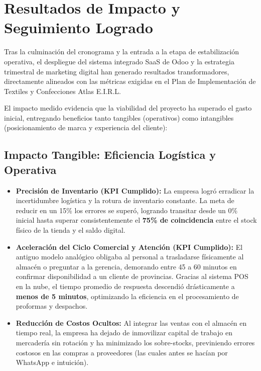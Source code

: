\section{Resultados de Impacto y Seguimiento Logrado}

Tras la culminación del cronograma y la entrada a la etapa de estabilización operativa, el despliegue del sistema integrado SaaS de Odoo y la estrategia trimestral de marketing digital han generado resultados transformadores, directamente alineados con las métricas exigidas en el Plan de Implementación de Textiles y Confecciones Atlas E.I.R.L.

El impacto medido evidencia que la viabilidad del proyecto ha superado el gasto inicial, entregando beneficios tanto tangibles (operativos) como intangibles (posicionamiento de marca y experiencia del cliente):

\subsection{Impacto Tangible: Eficiencia Logística y Operativa}
\begin{itemize}
    \item \textbf{Precisión de Inventario (KPI Cumplido):} La empresa logró erradicar la incertidumbre logística y la rotura de inventario constante. La meta de reducir en un 15\% los errores se superó, logrando transitar desde un 0\% inicial hasta superar consistentemente el \textbf{75\% de coincidencia} entre el stock físico de la tienda y el saldo digital. 
    \item \textbf{Aceleración del Ciclo Comercial y Atención (KPI Cumplido):} El antiguo modelo analógico obligaba al personal a trasladarse físicamente al almacén o preguntar a la gerencia, demorando entre 45 a 60 minutos en confirmar disponibilidad a un cliente de provincias. Gracias al sistema POS en la nube, el tiempo promedio de respuesta descendió drásticamente a \textbf{menos de 5 minutos}, optimizando la eficiencia en el procesamiento de proformas y despachos.
    \item \textbf{Reducción de Costos Ocultos:} Al integrar las ventas con el almacén en tiempo real, la empresa ha dejado de inmovilizar capital de trabajo en mercadería sin rotación y ha minimizado los sobre-stocks, previniendo errores costosos en las compras a proveedores (las cuales antes se hacían por WhatsApp e intuición).
\end{itemize}

